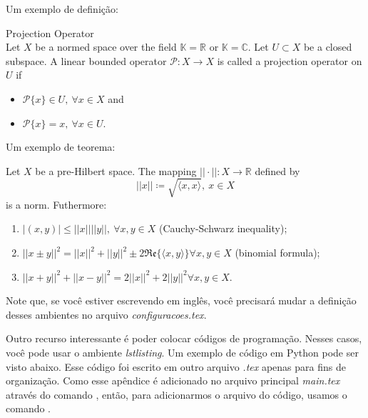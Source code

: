 		Um exemplo de definição:
		\begin{definition}\label{def:3:projection}
			Projection Operator\\
			Let $X$ be a normed space over the field $\mathbb{K}=\mathbb{R}$ or $\mathbb{K}=\mathbb{C}$. Let $U\subset X$ be a closed subspace. A linear bounded operator $\mathcal{P} : X\rightarrow X$ is called a projection operator on $U$ if
			\begin{itemize}
				\item $\mathcal{P}\{x\} \in U, ~\forall x\in X$ and
				\item $\mathcal{P}\{x\} = x,~ \forall x\in U$.
			\end{itemize}
		\end{definition}

		Um exemplo de teorema:
		\begin{theorem}\label{the:app:functional:1}
			Let $X$ be a pre-Hilbert space. The mapping $||\cdot|| : X\rightarrow\mathbb{R}$ defined by $$||x||\coloneqq\sqrt{\langle x,x\rangle},~x\in X$$ is a norm. Futhermore:
			\begin{enumerate}
				\item $|(x,y)|\le||x||||y||,~\forall x,y\in X$ (Cauchy-Schwarz inequality);
				\item $||x\pm y||^2 = ||x||^2+||y||^2\pm 2\mathfrak{Re}\{\langle x,y\rangle\}\forall x,y\in X$ (binomial formula);
				\item  $||x+y||^2 + ||x-y||^2 = 2||x||^2+2||y||^2\forall x,y\in X$.
			\end{enumerate}
		\end{theorem}

		Note que, se você estiver escrevendo em inglês, você precisará mudar a definição desses ambientes no arquivo \textit{configuracoes.tex}.

		Outro recurso interessante é poder colocar códigos de programação. Nesses casos, você pode usar o ambiente \textit{lstlisting}. Um exemplo de código em Python pode ser visto abaixo. Esse código foi escrito em outro arquivo \textit{.tex} apenas para fins de organização. Como esse apêndice é adicionado no arquivo principal \textit{main.tex} através do comando \verb||, então, para adicionarmos o arquivo do código, usamos o comando \verb||. 

		

